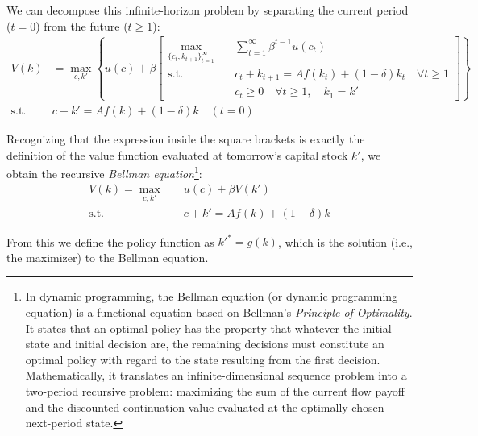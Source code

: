 We can decompose this infinite-horizon problem by separating the current period ($t=0$) from the future ($t \ge 1$):
\begin{align*}
    V(k) &= \max_{c, k'} \left\{ u(c) + \beta \left[ 
    \begin{aligned}
        \max_{\{c_t, k_{t+1}\}_{t=1}^\infty} \quad & \sum_{t=1}^\infty \beta^{t-1} u(c_t) \\
        \text{s.t.} \quad & c_t + k_{t+1} = A f(k_t) + (1-\delta)k_t \quad \forall t \ge 1 \\
        & c_t \ge 0 \quad \forall t \ge 1, \quad k_1 = k'
    \end{aligned}
    \right] \right\} \\
    \text{s.t.} \quad & c + k' = A f(k) + (1-\delta)k \quad (t=0)
\end{align*}

Recognizing that the expression inside the square brackets is exactly the definition of the value function evaluated at tomorrow's capital stock $k'$, we obtain the recursive \textit{Bellman equation}\footnote{In dynamic programming, the Bellman equation (or dynamic programming equation) is a functional equation based on Bellman's \textit{Principle of Optimality}. It states that an optimal policy has the property that whatever the initial state and initial decision are, the remaining decisions must constitute an optimal policy with regard to the state resulting from the first decision. Mathematically, it translates an infinite-dimensional sequence problem into a two-period recursive problem: maximizing the sum of the current flow payoff and the discounted continuation value evaluated at the optimally chosen next-period state.}:
\begin{align*}
    V(k) = \max_{c, k'} \quad & u(c) + \beta V(k') \\
    \text{s.t.} \quad & c + k' = A f(k) + (1-\delta)k
\end{align*}

From this we define the policy function as $k'^* = g(k)$, which is the solution (i.e., the maximizer) to the Bellman equation.


